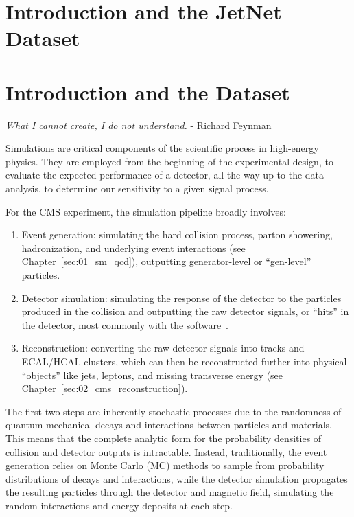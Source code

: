 
\ifdefined\HCode
    \chapter{Introduction and the JetNet Dataset}
\else
    \chapter{Introduction and the \jetnet Dataset}
\fi
\label{sec:04_intro}

\begin{center}
    \parbox{.8\linewidth}{%
        \centering
        \noindent
        \textit{What I cannot create, I do not understand.}
        - Richard Feynman
    }
\end{center}

Simulations are critical components of the scientific process in high-energy physics.
They are employed from the beginning of the experimental design, to evaluate the expected performance of a detector, all the way up to the data analysis, to determine our sensitivity to a given signal process.

For the CMS experiment, the simulation pipeline broadly involves:
\begin{enumerate}
    \item Event generation: simulating the hard collision process, parton showering, hadronization, and underlying event interactions (see Chapter~\ref{sec:01_sm_qcd}), outputting generator-level or ``gen-level'' particles.
    \item Detector simulation: simulating the response of the detector to the particles produced in the collision and outputting the raw detector signals, or ``hits'' in the detector, most commonly with the \GEANTfour software~\cite{Agostinelli:2002hh}.
    \item Reconstruction: converting the raw detector signals into tracks and ECAL/HCAL clusters, which can then be reconstructed further into physical ``objects'' like jets, leptons, and missing transverse energy (see Chapter~\ref{sec:02_cms_reconstruction}).
\end{enumerate}

The first two steps are inherently stochastic processes due to the randomness of quantum mechanical decays and interactions between particles and materials.
This means that the complete analytic form for the probability densities of collision and detector outputs is intractable.
Instead, traditionally, the event generation relies on Monte Carlo (MC) methods to sample from probability distributions of decays and interactions, while the detector simulation propagates the resulting particles through the detector and magnetic field, simulating the random interactions and energy deposits at each step.

